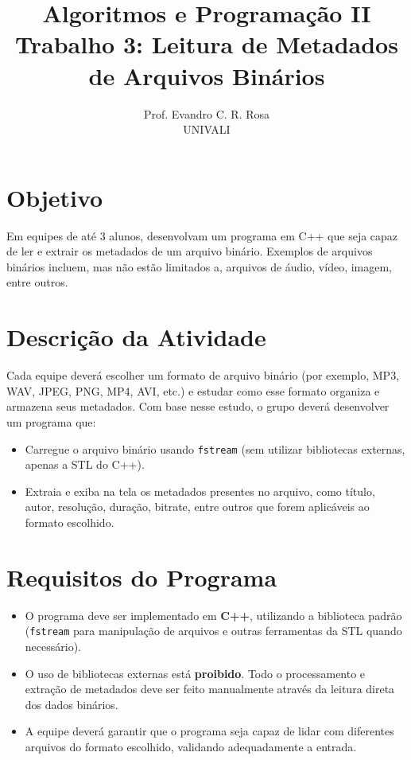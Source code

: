 \documentclass[12pt]{article}
\title{Algoritmos e Programação II\\
\large Trabalho 3: Leitura de Metadados de Arquivos Binários}
\author{Prof. Evandro C. R. Rosa\\UNIVALI}
\date{}
\begin{document}
\maketitle

\section*{Objetivo}
Em equipes de até 3 alunos, desenvolvam um programa em C++ que seja capaz de ler e extrair os metadados de um arquivo binário. Exemplos de arquivos binários incluem, mas não estão limitados a, arquivos de áudio, vídeo, imagem, entre outros.

\section*{Descrição da Atividade}
Cada equipe deverá escolher um formato de arquivo binário (por exemplo, MP3, WAV, JPEG, PNG, MP4, AVI, etc.) e estudar como esse formato organiza e armazena seus metadados. Com base nesse estudo, o grupo deverá desenvolver um programa que:

\begin{itemize}
  \item Carregue o arquivo binário usando \texttt{fstream} (sem utilizar bibliotecas externas, apenas a STL do C++).
  \item Extraia e exiba na tela os metadados presentes no arquivo, como título, autor, resolução, duração, bitrate, entre outros que forem aplicáveis ao formato escolhido.
\end{itemize}

\section*{Requisitos do Programa}
\begin{itemize}
  \item O programa deve ser implementado em \textbf{C++}, utilizando a biblioteca padrão (\texttt{fstream} para manipulação de arquivos e outras ferramentas da STL quando necessário).
  \item O uso de bibliotecas externas está \textbf{proibido}. Todo o processamento e extração de metadados deve ser feito manualmente através da leitura direta dos dados binários.
  \item A equipe deverá garantir que o programa seja capaz de lidar com diferentes arquivos do formato escolhido, validando adequadamente a entrada.
\end{itemize}
\end{document}
